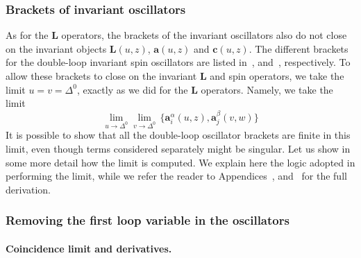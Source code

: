 \subsubsection{Brackets of invariant oscillators}
\label{sec:Brackets_inv_osc}

As for the $\mathbf{L}$ operators, the brackets of the invariant oscillators also do not close on the invariant objects $\mathbf{L}(u,z)$, $\mathbf{a}(u,z)$ and $\mathbf{c}(u,z)$. The different brackets for the double-loop invariant spin oscillators are listed in~,  and~, respectively. To allow these brackets to close on the invariant $\mathbf{L}$ and spin operators, we take the limit $u=v=\Delta^0$, exactly as we did for the $\mathbf{L}$ operators. Namely, we take the limit
\begin{equation}
\lim_{u \to \Delta^0} \lim_{v \to \Delta^0} \, \{ \mathbf{a}_i^\alpha(u,z), \mathbf{a}_j^\beta(v,w) \}
\end{equation}
It is possible to show that all the double-loop oscillator brackets are finite in this limit, even though terms considered separately might be singular. Let us show in some more detail how the limit is computed. We explain here the logic adopted in performing the limit, while we refer the reader to Appendices~,  and~ for the full derivation. 




\subsubsection{Removing the first loop variable in the oscillators}
\label{sec:removing_first_loop}

\paragraph{Coincidence limit and derivatives.}

